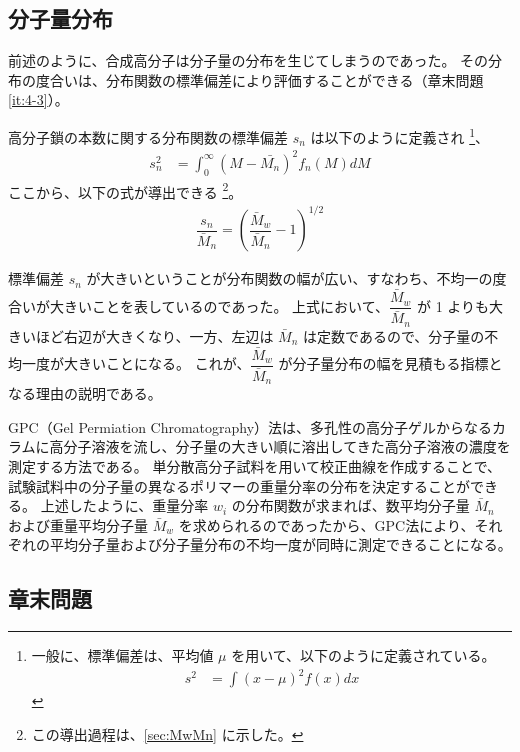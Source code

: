 \documentclass[uplatex,dvipdfmx,a4paper,11pt, titlepage]{jsarticle}
\begin{document}
\subsection{分子量分布}

前述のように、合成高分子は分子量の分布を生じてしまうのであった。
その分布の度合いは、分布関数の標準偏差により評価することができる（章末問題 \ref{it:4-3}）。

高分子鎖の本数に関する分布関数の標準偏差 $s_n$ は以下のように定義され
\footnote
{
一般に、標準偏差は、平均値 $\mu$ を用いて、以下のように定義されている。
\begin{align*}
s^2
	&= \displaystyle \int(x - \mu)^2 f(x) dx
\end{align*}
}、
\begin{align}
s_n^2
	&= \displaystyle \int_0^{\infty}(M - \bar{M_n})^2 f_n(M) dM
\end{align}
ここから、以下の式が導出できる
\footnote
{
この導出過程は、\ref{sec:MwMn} に示した。
}。
\begin{align}
\dfrac{s_n}{\bar{M}_n} = \left(\dfrac{\bar{M}_w}{\bar{M}_n}-1\right)^{1/2}
\end{align}

標準偏差 $s_n$ が大きいということが分布関数の幅が広い、すなわち、不均一の度合いが大きいことを表しているのであった。
上式において、$\dfrac{\bar{M}_w}{\bar{M}_n}$ が 1 よりも大きいほど右辺が大きくなり、一方、左辺は $\bar{M}_n$ は定数であるので、分子量の不均一度が大きいことになる。
これが、$\dfrac{\bar{M}_w}{\bar{M}_n}$ が分子量分布の幅を見積もる指標となる理由の説明である。
 
GPC（Gel Permiation Chromatography）法は、多孔性の高分子ゲルからなるカラムに高分子溶液を流し、分子量の大きい順に溶出してきた高分子溶液の濃度を測定する方法である。
単分散高分子試料を用いて校正曲線を作成することで、試験試料中の分子量の異なるポリマーの重量分率の分布を決定することができる。
上述したように、重量分率 $w_i$ の分布関数が求まれば、数平均分子量 $\bar{M}_n$ および重量平均分子量 $\bar{M}_w$ を求められるのであったから、GPC法により、それぞれの平均分子量および分子量分布の不均一度が同時に測定できることになる。



\subsection{章末問題}
\end{document}
